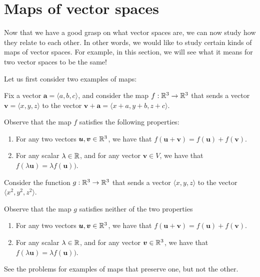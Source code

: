 \section{Maps of vector spaces}

Now that we have a good grasp on what vector spaces are, we can now study how they relate to each other.  In other words, we would like to study certain kinds of maps of vector spaces.  For example, in this section, we will see what it means for two vector spaces to be the same!  

Let us first consider two examples of maps:

\begin{example}
Fix a vector $\bm{a} = \langle a, b, c \rangle$, and consider the map $f: \mathbb{R}^3 \to \mathbb{R}^3$ that sends a vector $\bm{v} = \langle x, y, z \rangle$ to the vector $\bm{v} + \bm{a} = \langle x +a, y+b, z + c \rangle$.

Observe that the map $f$ satisfies the following properties:
\begin{enumerate}[label=(\roman*)]
        \item For any two vectors $\bm{u}, \bm{v} \in \mathbb{R}^3$, we have that $f(\bm{u}+ \bm{v}) = f(\bm{u}) + f(\bm{v})$.
        \item For any scalar $\lambda \in \mathbb{R}$, and for any vector $\bm{v} \in V$, we have that $f(\lambda \bm{u}) = \lambda f(\bm{u}))$.
    \end{enumerate}

\end{example}

\begin{example}
Consider the function $g: \mathbb{R}^3 \to \mathbb{R}^3$ that sends a vector $\langle x, y, z \rangle$ to the vector $\langle x^2, y^2, z^2 \rangle$.

Observe that the map $g$ satisfies neither of the two properties
    \begin{enumerate}[label=(\roman*)]
        \item For any two vectors $\bm{u}, \bm{v} \in \mathbb{R}^3$, we have that $f(\bm{u}+ \bm{v}) = f(\bm{u}) + f(\bm{v})$.
        \item For any scalar $\lambda \in \mathbb{R}$, and for any vector $\bm{v} \in \mathbb{R}^3$, we have that $f(\lambda \bm{u}) = \lambda f(\bm{u}))$.
    \end{enumerate}
\end{example}

See the problems  for examples of maps that preserve one, but not the other.


